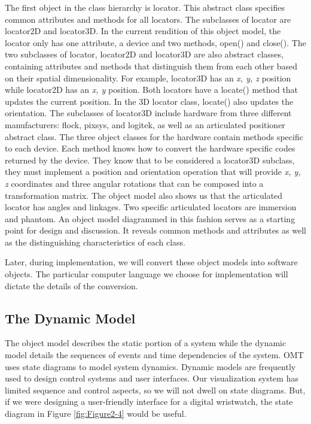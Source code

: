 The first object in the class hierarchy is locator. This abstract class specifies common attributes and methods for all locators. The subclasses of locator are locator2D and locator3D. In  the current rendition of this object model, the locator only has one attribute, a device and two methods, open() and close(). The two subclasses of locator, locator2D and locator3D are also abstract classes, containing attributes and methods that distinguish them from each other based on their spatial dimensionality. For example, locator3D has an \emph{x, y, z} position while locator2D has an \emph{x, y} position. Both locators have a locate() method that updates the current position. In the 3D locator class, locate() also updates the orientation. The subclasses of locator3D include hardware from three different manufacturers: flock, pixsys, and logitek, as well as an articulated positioner abstract class. The three object classes for the hardware contain methods specific to each device. Each method knows how to convert the hardware specific codes returned by the device. They know that to be considered a locator3D subclass, they must implement a position and orientation operation that will provide \emph{x, y, z} coordinates and three angular rotations that can be composed into a transformation matrix. The object model also shows us that the articulated locator has angles and linkages. Two specific articulated locators are immersion and phantom. An object model diagrammed in this fashion serves as a starting point for design and discussion. It reveals common methods and attributes as well as the distinguishing characteristics of each class.

Later, during implementation, we will convert these object models into software objects. The particular computer language we choose for implementation will dictate the details of the conversion.

\subsection{The Dynamic Model}

The object model describes the static portion of a system while the dynamic model details the sequences of events and time dependencies of the system. OMT uses state diagrams to model system dynamics. Dynamic models are frequently used to design control systems and user interfaces. Our visualization system has limited sequence and control aspects, so we will not dwell on state diagrams. But, if we were designing a user-friendly interface for a digital wristwatch, the state diagram in Figure \ref{fig:Figure2-4} would be useful.

